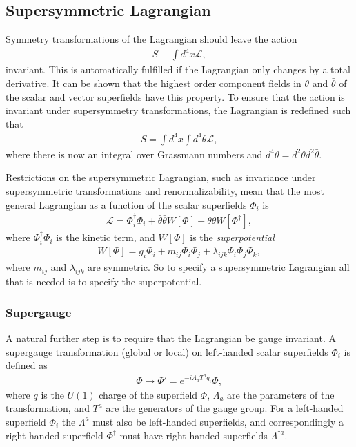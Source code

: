 \documentclass[twoside,english]{uiofysmaster}
\begin{document}
\subsection{Supersymmetric Lagrangian}

Symmetry transformations of the Lagrangian should leave the action
\begin{align}
S \equiv \int d^4x \mathcal{L},
\end{align}
 invariant. This is automatically fulfilled if the Lagrangian only changes by a total derivative. It can be shown that the highest order component fields in $\theta$ and $\bar{\theta}$ of the scalar and vector superfields have this property. To ensure that the action is invariant under supersymmetry transformations, the Lagrangian is redefined such that
\begin{align}
S = \int d^4x \int d^4 \theta \mathcal{L},
\end{align}
where there is now an integral over Grassmann numbers and $d^4 \theta = d^2 \theta d^2 \bar{\theta}$.

Restrictions on the supersymmetric Lagrangian, such as invariance under supersymmetric transformations and renormalizability, mean that the most general Lagrangian as a function of the scalar superfields $\Phi_i$ is
\begin{align}
\mathcal{L} = \Phi_i^{\dagger} \Phi_i + \bar{\theta} \bar{\theta} W[\Phi] + \theta \theta W[\Phi^{\dagger}],
\end{align}
where $\Phi_i^{\dagger} \Phi_i$ is the kinetic term, and $W[\Phi]$ is the \textit{superpotential}
\begin{align}\label{Eq:: superpotential}
W[\Phi] = g_i \Phi_i + m_{ij} \Phi_i \Phi_j + \lambda_{ijk} \Phi_i \Phi_j \Phi_k,
\end{align}
where $m_{ij}$ and $\lambda_{ijk}$ are symmetric. So to specify a supersymmetric Lagrangian all that is needed is to specify the superpotential. 

\subsubsection{Supergauge}

A natural further step is to require that the Lagrangian be gauge invariant. A supergauge transformation (global or local) on left-handed scalar superfields $\Phi_i$ is defined as \cite{batzing2017lecture} 
\begin{align}
\Phi \rightarrow \Phi' = e^{-i \Lambda_a T^a q_i} \Phi,
\end{align} 
where $q$ is the $U(1)$ charge of the superfield $\Phi$, $\Lambda_a$ are the parameters of the transformation, and $T^a$ are the generators of the gauge group. For a left-handed superfield $\Phi_i$ the $\Lambda^a$ must also be left-handed superfields, and correspondingly a right-handed superfield $\Phi^{\dagger}$ must have right-handed superfields $\Lambda^{\dagger a}$. 
\end{document}
